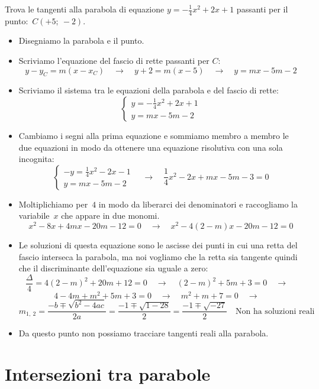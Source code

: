 \begin{esempio}
 Trova le tangenti alla parabola di equazione \(y=-\frac{1}{4}x^2+2x +1\) 
 passanti per il punto:~\(C(+5;~-2)\).
 
 \begin{itemize}
  \item Disegniamo la parabola e il punto.
  \item Scriviamo l'equazione del fascio di rette passanti per \(C\):
\[y-y_C = m(x-x_C) \quad \rightarrow \quad 
y+2 = m\left(x-5\right)
\quad \rightarrow \quad y=mx-5m-2\]
  \item Scriviamo il sistema tra le equazioni della parabola e del fascio di 
   rette:
\[\left\{\begin{array}{l}
  y=-\frac{1}{4}x^2+2x +1\\
  y=mx-5m-2
\end{array}\right. \]
  \item Cambiamo i segni alla prima equazione e sommiamo membro a membro le
   due equazioni in modo da ottenere una equazione risolutiva con una sola 
   incognita:
\[\left\{\begin{array}{l}
  -y=\frac{1}{4}x^2-2x-1\\
  y=mx-5m-2
\end{array}\right. \quad \rightarrow \quad 
\frac{1}{4}x^2-2x+mx-5m-3=0\]
  \item Moltiplichiamo per~\(4\) in modo da liberarci dei denominatori e 
   raccogliamo la variabile~\(x\) che appare in due monomi.
\[x^2-8x+4mx-20m-12=0 \quad \rightarrow \quad x^2-4(2-m)x-20m-12=0\]
  \item Le soluzioni di questa equazione sono le ascisse dei punti in cui una 
   retta del fascio interseca la parabola, ma noi vogliamo che la retta sia
   tangente quindi che il discriminante dell'equazione sia uguale a zero:
\[\frac{\Delta}{4}=4(2-m)^2+20m+12=0 \quad \rightarrow \quad 
(2-m)^2+5m+3=0 \quad \rightarrow \quad\]
\[4-4m+m^2+5m+3=0 \quad \rightarrow \quad
m^2+m+7=0 \quad \rightarrow \quad\]
\[m_{1,~2}=\frac{-b \mp \sqrt{b^2-4ac}}{2a}=\frac{-1 \mp \sqrt{1-28}}{2}=
\frac{-1 \mp \sqrt{-27}}{2} \quad \text{Non ha soluzioni reali}\]
  \item Da questo punto non possiamo tracciare tangenti reali alla
   parabola.
 \end{itemize}
\end{esempio}


\section{Intersezioni tra parabole}
\label{sec:parabola_intersezioniparabole}

